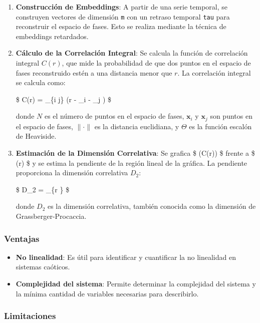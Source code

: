 \documentclass[11pt]{article}
\providecommand{\tightlist}{%
      \setlength{\itemsep}{0pt}\setlength{\parskip}{0pt}}
\begin{document}
\begin{enumerate}
\def\labelenumi{\arabic{enumi}.}
\item
  \textbf{Construcción de Embeddings}: A partir de una serie temporal,
  se construyen vectores de dimensión \texttt{m} con un retraso temporal
  \texttt{tau} para reconstruir el espacio de fases. Esto se realiza
  mediante la técnica de embeddings retardados.
\item
  \textbf{Cálculo de la Correlación Integral}: Se calcula la función de
  correlación integral \(C(r)\), que mide la probabilidad de que dos
  puntos en el espacio de fases reconstruido estén a una distancia menor
  que \(r\). La correlación integral se calcula como:

  \$ C(r) =  \sum\_\{i \ne j\} \Theta(r - \textbar{}
  \_i - \_j \textbar) \$

  donde \(N\) es el número de puntos en el espacio de fases,
  \(\mathbf{x}_i\) y \(\mathbf{x}_j\) son puntos en el espacio de fases,
  \(\| \cdot \|\) es la distancia euclidiana, y \(\Theta\) es la función
  escalón de Heaviside.
\item
  \textbf{Estimación de la Dimensión Correlativa}: Se grafica \$
  \log(C(r)) \$ frente a \$ \log(r) \$ y se estima la pendiente de la
  región lineal de la gráfica. La pendiente proporciona la dimensión
  correlativa \(D_2\):

  \$ D\_2 = \lim\_\{r \}  \$

  donde \(D_2\) es la dimensión correlativa, también conocida como la
  dimensión de Grassberger-Procaccia.
\end{enumerate}

\hypertarget{ventajas}{%
\subsubsection{Ventajas}\label{ventajas}}

\begin{itemize}
\tightlist
\item
  \textbf{No linealidad}: Es útil para identificar y cuantificar la no
  linealidad en sistemas caóticos.
\item
  \textbf{Complejidad del sistema}: Permite determinar la complejidad
  del sistema y la mínima cantidad de variables necesarias para
  describirlo.
\end{itemize}

\hypertarget{limitaciones}{%
\subsubsection{Limitaciones}\label{limitaciones}}
\end{document}
